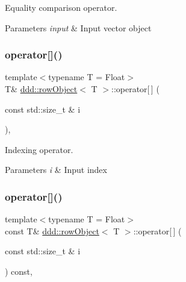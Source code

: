 Equality comparison operator. 


\begin{DoxyParams}{Parameters}
{\em input} & Input vector object \\
\hline
\end{DoxyParams}
\mbox{\label{classddd_1_1row_object_aff4fdb32f8b837e224b26de2bcecc7d2}} 
\subsubsection{\texorpdfstring{operator[]()}{operator[]()}\hspace{0.1cm}{\footnotesize\ttfamily [1/2]}}
{\footnotesize\ttfamily template$<$typename T  = Float$>$ \\
T\& \hyperlink{classddd_1_1row_object}{ddd\+::row\+Object}$<$ T $>$\+::operator\mbox{[}$\,$\mbox{]} (\begin{DoxyParamCaption}\item[{const std\+::size\+\_\+t \&}]{i }\end{DoxyParamCaption})\hspace{0.3cm}{\ttfamily [inline]}, {\ttfamily [inherited]}}



Indexing operator. 


\begin{DoxyParams}{Parameters}
{\em i} & Input index \\
\hline
\end{DoxyParams}
\mbox{\label{classddd_1_1row_object_a60418f8af09e6913d16b48f2cb53e826}} 
\subsubsection{\texorpdfstring{operator[]()}{operator[]()}\hspace{0.1cm}{\footnotesize\ttfamily [2/2]}}
{\footnotesize\ttfamily template$<$typename T  = Float$>$ \\
const T\& \hyperlink{classddd_1_1row_object}{ddd\+::row\+Object}$<$ T $>$\+::operator\mbox{[}$\,$\mbox{]} (\begin{DoxyParamCaption}\item[{const std\+::size\+\_\+t \&}]{i }\end{DoxyParamCaption}) const\hspace{0.3cm}{\ttfamily [inline]}, {\ttfamily [inherited]}}



